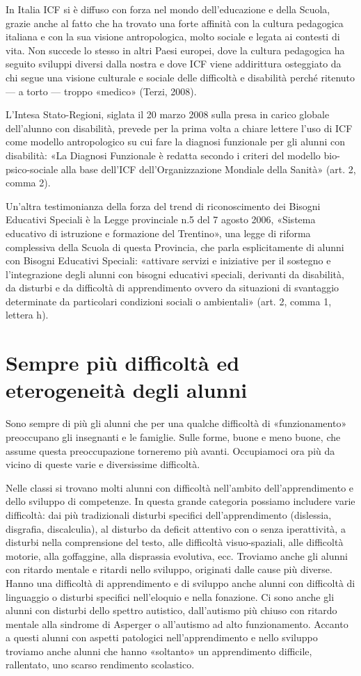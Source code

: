 In Italia ICF si è diffuso con forza nel mondo dell'educazione e della Scuola, grazie anche al
fatto che ha trovato una forte affinità con la cultura pedagogica italiana e con la sua visione
antropologica, molto sociale e legata ai contesti di vita. Non succede lo stesso in altri Paesi europei,
dove la cultura pedagogica ha seguito sviluppi diversi dalla nostra e dove ICF viene addirittura
osteggiato da chi segue una visione culturale e sociale delle difficoltà e disabilità perché ritenuto —
a torto — troppo «medico» (Terzi, 2008).

L'Intesa Stato-Regioni, siglata il 20 marzo 2008 sulla presa in carico globale dell'alunno con
disabilità, prevede per la prima volta a chiare lettere l'uso di ICF come modello antropologico su
cui fare la diagnosi funzionale per gli alunni con disabilità: «La Diagnosi Funzionale è redatta
secondo i criteri del modello bio-psico-sociale alla base dell'ICF dell'Organizzazione Mondiale della
Sanità» (art. 2, comma 2).

Un'altra testimonianza della forza del trend di riconoscimento dei Bisogni Educativi Speciali è
la Legge provinciale n.5 del 7 agosto 2006, «Sistema educativo di istruzione e formazione del
Trentino», una legge di riforma complessiva della Scuola di questa Provincia, che parla
esplicitamente di alunni con Bisogni Educativi Speciali: «attivare servizi e iniziative per il sostegno e
l'integrazione degli alunni con bisogni educativi speciali, derivanti da disabilità, da disturbi e da
difficoltà di apprendimento ovvero da situazioni di svantaggio determinate da particolari condizioni
sociali o ambientali» (art. 2, comma 1, lettera h).
\section*{Sempre più difficoltà ed eterogeneità degli alunni}
Sono sempre di più gli alunni che per una qualche difficoltà di «funzionamento» preoccupano
gli insegnanti e le famiglie. Sulle forme, buone e meno buone, che assume questa preoccupazione
torneremo più avanti. Occupiamoci ora più da vicino di queste varie e diversissime difficoltà.

Nelle classi si trovano molti alunni con difficoltà nell'ambito dell'apprendimento e dello
sviluppo di competenze. In questa grande categoria possiamo includere varie difficoltà: dai più
tradizionali disturbi specifici dell'apprendimento (dislessia, disgrafia, discalculia), al disturbo da
deficit attentivo con o senza iperattività, a disturbi nella comprensione del testo, alle difficoltà
visuo-spaziali, alle difficoltà motorie, alla goffaggine, alla disprassia evolutiva, ecc. Troviamo anche
gli alunni con ritardo mentale e ritardi nello sviluppo, originati dalle cause più diverse. Hanno una
difficoltà di apprendimento e di sviluppo anche alunni con difficoltà di linguaggio o disturbi
specifici nell'eloquio e nella fonazione. Ci sono anche gli alunni con disturbi dello spettro autistico,
dall'autismo più chiuso con ritardo mentale alla sindrome di Asperger o all'autismo ad alto
funzionamento. Accanto a questi alunni con aspetti patologici nell'apprendimento e nello sviluppo
troviamo anche alunni che hanno «soltanto» un apprendimento difficile, rallentato, uno scarso
rendimento scolastico.

